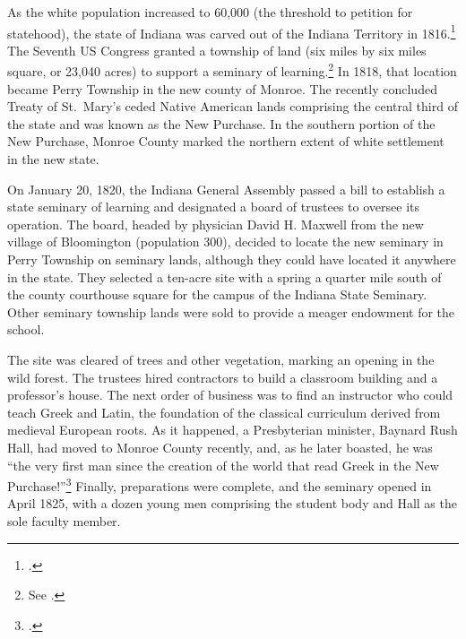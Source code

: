 \documentclass[
  american,
  letterpaper,
]{scrreprt}
\begin{document}
As the white population increased to 60,000 (the threshold to petition
for statehood), the state of Indiana was carved out of the Indiana
Territory in 1816.\footnote{.} The Seventh US Congress granted a township of land (six miles by
six miles square, or 23,040 acres) to support a seminary of
learning.\footnote{See .} In 1818, that
location became Perry Township in the new county of Monroe. The recently
concluded Treaty of St.~Mary's ceded Native American lands comprising
the central third of the state and was known as the New Purchase. In the
southern portion of the New Purchase, Monroe County marked the northern
extent of white settlement in the new state.

On January 20, 1820, the Indiana General Assembly passed a bill to
establish a state seminary of learning and designated a board of
trustees to oversee its operation. The board, headed by physician David
H. Maxwell from the new village of Bloomington (population 300), decided
to locate the new seminary in Perry Township on seminary lands, although
they could have located it anywhere in the state. They selected a
ten-acre site with a spring a quarter mile south of the county
courthouse square for the campus of the Indiana State Seminary. Other
seminary township lands were sold to provide a meager endowment for the
school.

The site was cleared of trees and other vegetation, marking an opening
in the wild forest. The trustees hired contractors to build a classroom
building and a professor's house. The next order of business was to find
an instructor who could teach Greek and Latin, the foundation of the
classical curriculum derived from medieval European roots. As it
happened, a Presbyterian minister, Baynard Rush Hall, had moved to
Monroe County recently, and, as he later boasted, he was ``the very
first man since the creation of the world that read Greek in the New
Purchase!''\footnote{.} Finally, preparations were complete,
and the seminary opened in April 1825, with a dozen young men comprising
the student body and Hall as the sole faculty member.
\end{document}
